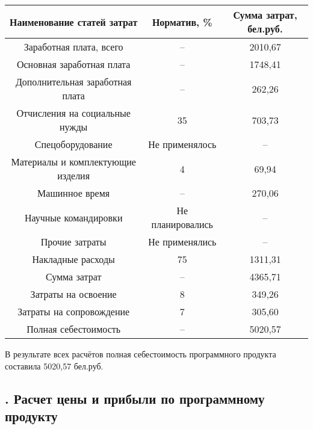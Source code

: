 {{\begin{Center}
	\begin{tabular}{|c|c|c|}
		\hline
		Наименование статей затрат & Норматив, \% & Сумма затрат, бел.руб. \\ \hline
		Заработная плата, всего & {--} & 2010,67 \\ \hline
		Основная заработная плата & {--} & 1748,41 \\ \hline
		Дополнительная заработная плата & {--} & 262,26 \\ \hline
		Отчисления на социальные нужды & 35 & 703,73 \\ \hline
		Спецоборудование & Не применялось & {--} \\ \hline
		Материалы и комплектующие изделия & 4 & 69,94 \\ \hline
		Машинное время & {--} & 270,06 \\ \hline
		Научные командировки & Не планировались & {--} \\ \hline
		Прочие затраты & Не применялись & {--} \\ \hline
		Накладные расходы & 75 & 1311,31 \\ \hline
		Сумма затрат & {--} & 4365,71 \\ \hline
		Затраты на освоение & 8 & 349,26 \\ \hline
		Затраты на сопровождение & 7 & 305,60 \\ \hline
		Полная себестоимость & {--} & 5020,57 \\ \hline
	\end{tabular} \end{Center}} \addtocounter{tablecntr}{1} 
	\botTablespace
	
	\par \redline В результате всех расчётов полная себестоимость программного продукта составила 5020,57 бел.руб. 
}


\subtitlespace

\subsection*{ 
	\gostTitleFont
	\redline
	\thechaptercntr .\thesubchaptercntr \spc
	Расчет цены и прибыли по программному продукту
} \addtocounter{subchaptercntr}{1}

\subtitlespace

